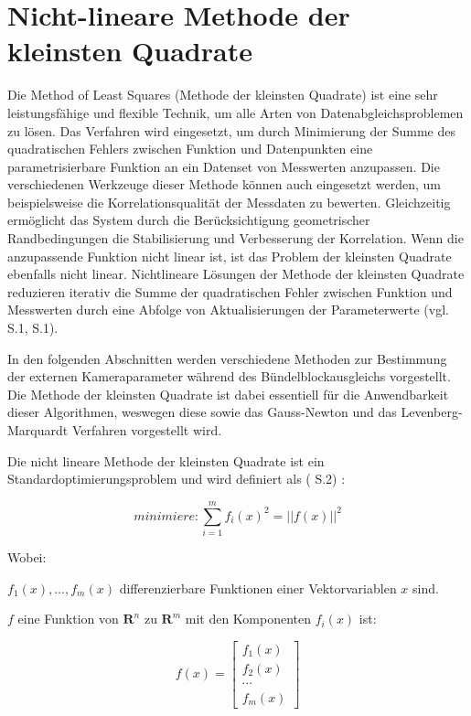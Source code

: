 \section{Nicht-lineare Methode der kleinsten Quadrate}
Die \glqq Method of Least Squares\grqq{} (Methode der kleinsten Quadrate) ist eine sehr leistungsfähige und flexible Technik, um alle Arten von Datenabgleichsproblemen zu lösen. Das Verfahren wird eingesetzt, um durch Minimierung der Summe des quadratischen Fehlers zwischen Funktion und Datenpunkten eine parametrisierbare Funktion an ein Datenset von Messwerten anzupassen. Die verschiedenen Werkzeuge dieser Methode können auch eingesetzt werden, um beispielsweise die Korrelationsqualität der Messdaten zu bewerten. Gleichzeitig ermöglicht das System durch die Berücksichtigung geometrischer Randbedingungen die Stabilisierung und Verbesserung der Korrelation. Wenn die anzupassende Funktion nicht linear ist, ist das Problem der kleinsten Quadrate ebenfalls nicht linear. Nichtlineare Lösungen der Methode der kleinsten Quadrate reduzieren iterativ die Summe der quadratischen Fehler zwischen Funktion und Messwerten durch eine Abfolge von Aktualisierungen der Parameterwerte (vgl. \cite{least_quares} S.1, \cite{lev_mar} S.1).

In den folgenden Abschnitten werden verschiedene Methoden zur Bestimmung der externen Kameraparameter während des Bündelblockausgleichs vorgestellt. Die Methode der kleinsten Quadrate ist dabei essentiell für die Anwendbarkeit dieser Algorithmen, weswegen diese sowie das Gauss-Newton und das Levenberg-Marquardt Verfahren vorgestellt wird. 

Die nicht lineare Methode der kleinsten Quadrate ist ein Standardoptimierungsproblem und wird definiert als (\cite{nonlinear_1} S.2) :

\begin{equation}
minimiere: \sum_{i=1}^m f_i(x)^2 =  ||f(x)||^2
\end{equation} 

Wobei: 

$f_1(x),...,f_m(x)$ differenzierbare Funktionen einer Vektorvariablen $x$ sind.

$f$ eine Funktion von $\textbf{R}^n$ zu $\textbf{R}^m$ mit den Komponenten $f_i(x)$ ist:

\begin{equation}
f(x) = \begin{bmatrix}
f_1(x)\\ f_2(x)\\ \cdots \\ f_m(x)
\end{bmatrix}
\end{equation} 

